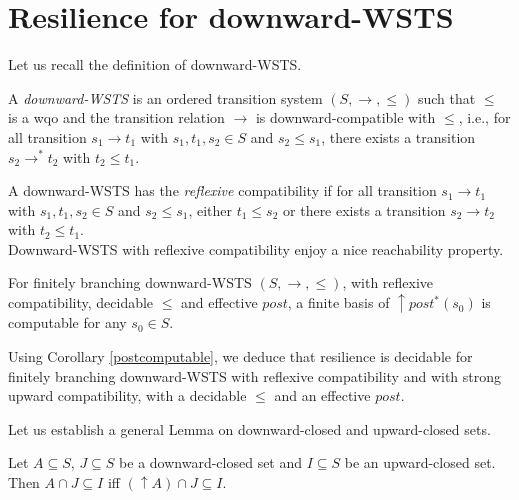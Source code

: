 
\section{Resilience for downward-WSTS}

Let us recall the definition of downward-WSTS.

\begin{definition} \cite{DBLP:journals/tcs/FinkelS01}
A \emph{downward-WSTS} is an ordered transition system $(S, \rightarrow, \leq)$
such that $\leq$ is a wqo and
the transition relation $ \rightarrow$ is downward-compatible with $\leq$, i.e., for all  transition $s_1 \rightarrow t_1$
with $s_1, t_1 , s_2 \in S$
	and $s_2 \leq s_1$, there exists a transition $s_2 \rightarrow^{*} t_2$ with $t_2 \leq t_1$. 		
\end{definition}

A downward-WSTS has the \emph{reflexive} compatibility if for all transition  $s_1 \rightarrow t_1$ with
$s_1, t_1 , s_2 \in S$ and $s_2 \leq s_1$, either $t_1 \leq s_2$ or there exists a transition $s_2 \rightarrow t_2$ with $t_2 \leq t_1$.\\

Downward-WSTS with reflexive compatibility enjoy a nice reachability property.

\begin{theorem}
For finitely branching downward-WSTS $(S, \rightarrow, \leq)$, with reflexive compatibility, decidable $\leq$ and effective $post$, a finite basis of $\uparrow post^*(s_0)$ is computable for any $s_0 \in S$.
\end{theorem}

Using Corollary \ref{postcomputable}, we deduce that resilience is decidable for finitely branching downward-WSTS with reflexive compatibility and with strong upward compatibility, with a decidable $\leq$ and an effective $post$.


Let us establish a general Lemma on downward-closed and upward-closed sets.

\begin{lemma}\label{Lemma intersection}
Let $A \subseteq S$, $J \subseteq S$ be a downward-closed set and $I \subseteq S$ be an upward-closed set. 
Then $A \cap J \subseteq I$  iff $ (\uparrow  A) \cap J \subseteq I$.
\end{lemma}


